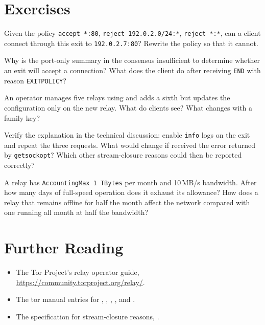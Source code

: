 \section*{Exercises}

\begin{esercizio}[1]\label{es:22-ordine}
Given the policy \texttt{accept *:80}, \texttt{reject 192.0.2.0/24:*}, \texttt{reject *:*}, can a client connect through this exit to \texttt{192.0.2.7:80}? Rewrite the policy so that it cannot.
\end{esercizio}

\begin{esercizio}[1]\label{es:22-riassunto}
Why is the port-only summary in the consensus insufficient to determine whether an exit will accept a connection? What does the client do after receiving \texttt{END} with reason \texttt{EXITPOLICY}?
\end{esercizio}

\begin{esercizio}[2]\label{es:22-famiglia}
An operator manages five relays using  and adds a sixth but updates the configuration only on the new relay. What do clients see? What changes with a family key?
\end{esercizio}

\begin{esercizio}[2]\label{es:22-refused}
Verify the explanation in the technical discussion: enable \texttt{info} logs on the exit and repeat the three requests. What would change if  received the error returned by \texttt{getsockopt}? Which other stream-closure reasons could then be reported correctly?
\end{esercizio}

\begin{esercizio}[3]\label{es:22-accounting}
A relay has \texttt{AccountingMax 1 TBytes} per month and 10\,MB/s bandwidth. After how many days of full-speed operation does it exhaust its allowance? How does a relay that remains offline for half the month affect the network compared with one running all month at half the bandwidth?
\end{esercizio}

\section*{Further Reading}
\begin{itemize}
  \item The Tor Project's relay operator guide, \url{https://community.torproject.org/relay/}.
  \item \begin{sloppypar}The tor manual entries for , ,
        , , and .\end{sloppypar}
  \item The specification for stream-closure reasons, .
\end{itemize}
